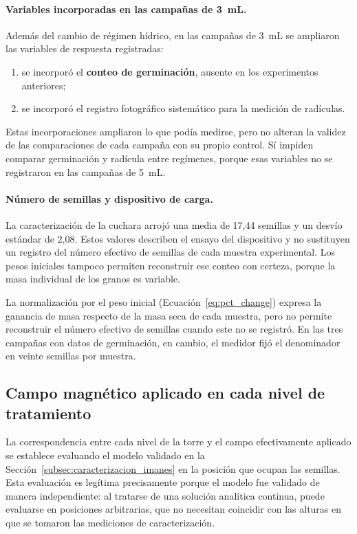 \paragraph{Variables incorporadas en las campañas de 3~mL.}

Además del cambio de régimen hídrico, en las campañas de 3~mL se ampliaron las variables de respuesta registradas:

\begin{enumerate}
    \item se incorporó el \textbf{conteo de germinación}, ausente en los experimentos anteriores;
    \item se incorporó el registro fotográfico sistemático para la medición de radículas.
\end{enumerate}

Estas incorporaciones ampliaron lo que podía medirse, pero no alteran la validez de las comparaciones de cada campaña con su propio control. Sí impiden comparar germinación y radícula entre regímenes, porque esas variables no se registraron en las campañas de 5~mL.

\paragraph{Número de semillas y dispositivo de carga.}

La caracterización de la cuchara arrojó una media de 17{,}44 semillas y un desvío estándar de 2{,}08. Estos valores describen el ensayo del dispositivo y no sustituyen un registro del número efectivo de semillas de cada muestra experimental. Los pesos iniciales tampoco permiten reconstruir ese conteo con certeza, porque la masa individual de los granos es variable.

La normalización por el peso inicial (Ecuación~\ref{eq:pct_change}) expresa la ganancia de masa respecto de la masa seca de cada muestra, pero no permite reconstruir el número efectivo de semillas cuando este no se registró. En las tres campañas con datos de germinación, en cambio, el medidor fijó el denominador en veinte semillas por muestra.

\subsection{Campo magnético aplicado en cada nivel de tratamiento}
\label{subsec:dosis}

La correspondencia entre cada nivel de la torre y el campo efectivamente aplicado se establece evaluando el modelo validado en la Sección~\ref{subsec:caracterizacion_imanes} en la posición que ocupan las semillas. Esta evaluación es legítima precisamente porque el modelo fue validado de manera independiente: al tratarse de una solución analítica continua, puede evaluarse en posiciones arbitrarias, que no necesitan coincidir con las alturas en que se tomaron las mediciones de caracterización.

